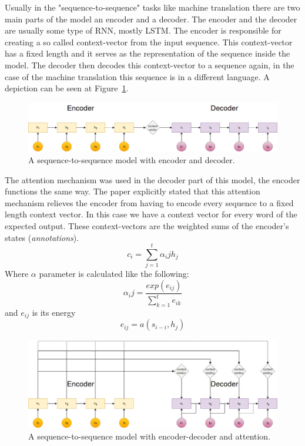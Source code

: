 Usually in the "sequence-to-sequence" tasks like machine translation there are two main parts of the model an encoder and a decoder. The encoder and the decoder are usually some type of RNN, mostly LSTM. The encoder is responsible for creating a so called context-vector from the input sequence. This context-vector has a fixed length and it serves as the representation of the sequence inside the model. The decoder then decodes this context-vector to a sequence again, in the case of the machine translation this sequence is in a different language. A depiction can be seen at Figure~\ref{fig:seq_to_seq}.
\begin{figure}[!ht]
	\centering
	\includegraphics[width=150mm, keepaspectratio]{figures/seq_to_seq.jpg}
	\caption{A sequence-to-sequence model with encoder and decoder.}
	\label{fig:seq_to_seq}
\end{figure}

The attention mechanism was used in the decoder part of this model, the encoder functions the same way. The paper explicitly stated that this attention mechanism relieves the encoder from having to encode every sequence to a fixed length context vector. In this case we have a context vector for every word of the expected output. These context-vectors are the weighted sums of the encoder's states (\textit{annotations}).
\[c_i = \sum_{j=1}^{t} \alpha_ij h_j\]
Where \(\alpha\) parameter is calculated like the following:
\[\alpha_ij = \frac{exp(e_{ij})}{\sum_{k=1}^{t} e_{ik}} \]
and \(e_{ij}\) is its energy
\[e_{ij} = a(s_{i-i}, h_j)\]

\begin{figure}[!ht]
	\centering
	\includegraphics[width=150mm, keepaspectratio]{figures/attention.jpg}
	\caption{A sequence-to-sequence model with encoder-decoder and attention.}
	\label{fig:attention}
\end{figure}

